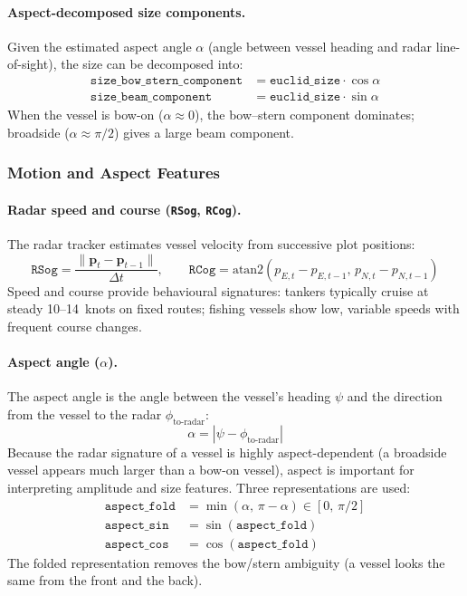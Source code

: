 \documentclass[12pt, a4paper]{article}
\newcommand{\vect}[1]{\boldsymbol{#1}}
\begin{document}
\paragraph{Aspect-decomposed size components.}
Given the estimated aspect angle $\alpha$ (angle between vessel heading and
radar line-of-sight), the size can be decomposed into:
\begin{align}
    \texttt{size\_bow\_stern\_component} &= \texttt{euclid\_size} \cdot \cos\alpha \\
    \texttt{size\_beam\_component}       &= \texttt{euclid\_size} \cdot \sin\alpha
\end{align}
When the vessel is bow-on ($\alpha \approx 0$), the bow--stern component
dominates; broadside ($\alpha \approx \pi/2$) gives a large beam component.

\subsubsection{Motion and Aspect Features}

\paragraph{Radar speed and course (\texttt{RSog}, \texttt{RCog}).}
The radar tracker estimates vessel velocity from successive plot positions:
\begin{equation}
    \texttt{RSog} = \frac{\|\vect{p}_{t} - \vect{p}_{t-1}\|}{\Delta t}, \qquad
    \texttt{RCog} = \text{atan2}(p_{E,t}-p_{E,t-1},\, p_{N,t}-p_{N,t-1})
\end{equation}
Speed and course provide behavioural signatures: tankers typically cruise at
steady 10--14~knots on fixed routes; fishing vessels show low, variable speeds
with frequent course changes.

\paragraph{Aspect angle ($\alpha$).}
The aspect angle is the angle between the vessel's heading $\psi$ and the
direction from the vessel to the radar $\phi_{\text{to-radar}}$:
\begin{equation}
    \alpha = |\psi - \phi_{\text{to-radar}}|
\end{equation}
Because the radar signature of a vessel is highly aspect-dependent (a broadside
vessel appears much larger than a bow-on vessel), aspect is important for
interpreting amplitude and size features. Three representations are used:
\begin{align}
    \texttt{aspect\_fold}  &= \min(\alpha,\, \pi - \alpha) \in [0,\, \pi/2] \\
    \texttt{aspect\_sin}   &= \sin(\texttt{aspect\_fold}) \\
    \texttt{aspect\_cos}   &= \cos(\texttt{aspect\_fold})
\end{align}
The folded representation removes the bow/stern ambiguity (a vessel looks the
same from the front and the back).
\end{document}
